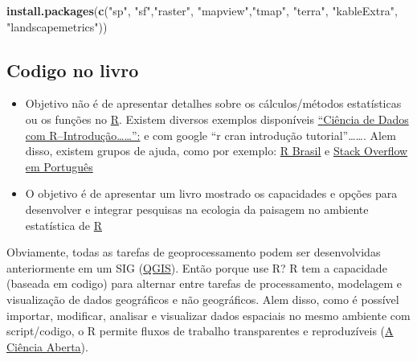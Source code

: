 \documentclass[
]{article}
\newenvironment{Shaded}{\begin{snugshade}}{\end{snugshade}}
\newcommand{\FunctionTok}[1]{\textcolor[rgb]{0.13,0.29,0.53}{\textbf{#1}}}
\newcommand{\NormalTok}[1]{#1}
\newcommand{\StringTok}[1]{\textcolor[rgb]{0.31,0.60,0.02}{#1}}
\begin{document}
\begin{Shaded}
\begin{Highlighting}[]
\FunctionTok{install.packages}\NormalTok{(}\FunctionTok{c}\NormalTok{(}\StringTok{"sp"}\NormalTok{, }\StringTok{"sf"}\NormalTok{,}\StringTok{"raster"}\NormalTok{, }\StringTok{"mapview"}\NormalTok{,}\StringTok{"tmap"}\NormalTok{, }
                   \StringTok{"terra"}\NormalTok{, }\StringTok{"kableExtra"}\NormalTok{, }\StringTok{"landscapemetrics"}\NormalTok{))}
\end{Highlighting}
\end{Shaded}

\hypertarget{codigo-no-livro}{%
\subsection*{Codigo no livro}\label{codigo-no-livro}}

\begin{itemize}
\item
  Objetivo não é de apresentar detalhes sobre os cálculos/métodos estatísticas ou os funções no \href{https://cran.r-project.org/}{R}. Existem diversos exemplos disponíveis \href{https://cdr.ibpad.com.br/cdr-intro.pdf}{``Ciência de Dados com R--Introdução\ldots\ldots{}'':} e com google ``r cran introdução tutorial''\ldots\ldots. Alem disso, existem grupos de ajuda, como por exemplo: \href{https://www.facebook.com/groups/rbrasilprogramadores/}{R Brasil} e \href{https://pt.stackoverflow.com/questions/tagged/r}{Stack Overflow em Português}
\item
  O objetivo é de apresentar um livro mostrado os capacidades e opções para desenvolver e integrar pesquisas na ecologia da paisagem no ambiente estatística de \href{https://cran.r-project.org/}{R}
\end{itemize}

Obviamente, todas as tarefas de geoprocessamento podem ser desenvolvidas anteriormente em um SIG (\href{https://docs.qgis.org/3.22/pt_BR/docs/training_manual/}{QGIS}). Então porque use R? R tem a capacidade (baseada em codigo) para alternar entre tarefas de processamento, modelagem e visualização de dados geográficos e não geográficos. Alem disso, como é possível importar, modificar, analisar e visualizar dados espaciais no mesmo ambiente com script/codigo, o R permite fluxos de trabalho transparentes e reproduzíveis (\href{https://foster.gitbook.io/manual-de-formacao-em-ciencia-aberta/02introducaoacienciaaberta/01conceito_e_principios_da_ciencia_aberta}{A Ciência Aberta}).
\end{document}
